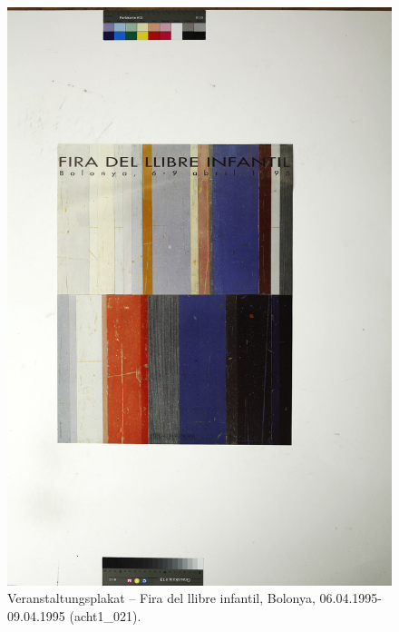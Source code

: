 \documentclass[a4paper,12pt,ngerman]{article}
\begin{document}
\newpage
\begin{figure}[ht]
\includegraphics[width=\linewidth]{Abbildung_33_(acht1_021)}
\centering
\caption{Veranstaltungsplakat – Fira del llibre infantil, Bolonya, 06.04.1995-09.04.1995 (acht1\_021).}
\end{figure}
\end{document}
